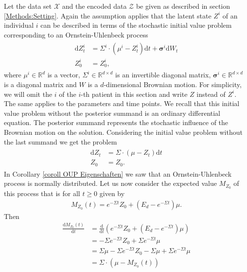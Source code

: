\documentclass[11pt,titlepage]{article}
\newcommand{\R}{\mathbb{R}} %
\theoremstyle{definition}
\theoremstyle{remark}
\begin{document}
	Let the data set $\mathcal{X}$ and the encoded data $\mathcal{Z}$ be given as described in section \ref{Methods:Setting}. Again the assumption applies that the latent state $Z^i$ of an individual $i$ can be described in terms of the stochastic initial value problem corresponding to an Ornstein-Uhlenbeck process
	\begin{align*}
		\begin{split} 
			\mathrm{d}Z_t^i &= \Sigma^i \cdot (\mu^i- Z_t^i)\mathrm{d}t +\boldsymbol{\sigma}^i \mathrm{d}W_t\\
			Z^i_0 &= Z^i_0, 
		\end{split} 
	\end{align*}
	where $\mu^i\in\R^d$ is a vector, $\Sigma^i\in\R^{d\times d}$ is an invertible diagonal matrix, $\boldsymbol{\sigma}^i\in\R^{d\times d}$ is a diagonal matrix and $W$ is a $d$-dimensional Brownian motion. For simplicity, we will omit the $i$ of the $i$-th patient in this section and write $Z$ instead of $Z^i$. The same applies to the parameters and time points. We recall that this initial value problem without the posterior summand is an ordinary differential equation. The posterior summand represents the stochastic influence of the Brownian motion on the solution. Considering the initial value problem without the last summand we get the problem
	\begin{align*}
		\begin{split} 
			\mathrm{d}Z_t &= \Sigma \cdot (\mu- Z_t)\mathrm{d}t\\
			Z_0 &= Z_0. 
		\end{split} 
	\end{align*}
	In Corollary \ref{coroll OUP Eigenschaften} we saw that an Ornstein-Uhlenbeck process is normally distributed. Let us now consider the expected value $M_{Z_0}$ of this process that is for all $t\geq 0$ given by
	\begin{align*}
		M_{Z_0}(t) = e^{-\Sigma t}Z_0 +(E_d-e^{-\Sigma t})\mu.
	\end{align*}
	Then
	\begin{align*}
		\frac{\mathrm{d} M_{Z_0}(t)}{\mathrm{d}t}&= \frac{\mathrm{d}}{\mathrm{d}t}\left(e^{-\Sigma t}Z_0 + (E_d -e^{-\Sigma t})\mu\right)\\
		&=-\Sigma e^{-\Sigma t}Z_0 + \Sigma e^{-\Sigma t}\mu\\
		&=\Sigma \mu -\Sigma e^{-\Sigma t}Z_0 -\Sigma \mu +\Sigma e^{-\Sigma t}\mu\\
		&=\Sigma \cdot (\mu - M_{Z_0}(t))
	\end{align*}
\end{document}
